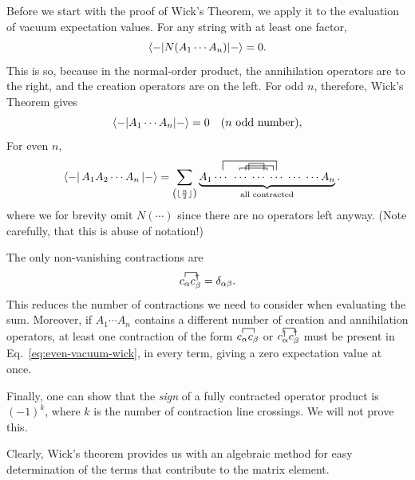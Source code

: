 \documentclass{report}
\theoremstyle{plain}
\theoremstyle{definition}
\begin{document}
Before we start with the proof of Wick's Theorem, we apply it to the
evaluation of  vacuum expectation values. For any
string with at least one factor,
\begin{equation}
  \braket{-|N(A_1\cdots A_n)|-} = 0.
\end{equation}
This is so, because in the normal-order product, the annihilation
operators are to the right, and the creation operators are on the
left. For odd $n$, therefore, Wick's Theorem gives
\begin{equation}
  \braket{-|A_1\cdots A_n|-} = 0\quad (\text{$n$ odd number}),
\end{equation}
For even $n$,
\begin{align}
\label{eq:even-vacuum-wick}
\bra{-}A_1 A_2 \cdots A_n\ket{-} &=
\sum_{\pr{\lfloor{\frac{n}{2}}\rfloor}}  \underbrace{A_1
    \contraction[2ex]{..}{A}{\hspace{4em}}{A} \cdots\;
    \contraction[.5ex]{.}{A}{......}{A}
    \contraction[1.5ex]{....}{A}{..}{A}\contraction[1ex]{...}{A}{......}{A}
    \cdots \; \cdots \; \cdots \; \cdots \;\cdots A_n}_{\text{all contracted}}.
\end{align}
where we for brevity omit $N(\cdots)$ since there are no operators
left anyway. (Note carefully, that this is abuse of notation!)

The only non-vanishing contractions are
\begin{align}
\contraction{}{\an{\alpha}}{}{\cre{\beta}}
\an{\alpha}\cre{\beta} = \delta_{\alpha \beta}.
\end{align}
This reduces the number of contractions we need to consider when
evaluating the sum. Moreover, if $A_1\cdots A_n$ contains a different number of creation and
annihilation operators, at least one contraction of the form
$\contraction{}{c_\alpha}{}{c_\beta}c_\alpha c_\beta$ or
$\contraction{}{c_\alpha}{}{c_\beta}c^\dag_\alpha
c^\dag_\beta$ must be present in Eq.~\eqref{eq:even-vacuum-wick},
in every term, giving a zero expectation value at once.


Finally, one can show that the \emph{sign} of a fully contracted
operator product is $(-1)^k$, where $k$ is the number of contraction
line crossings. We will not prove this.


Clearly, Wick's theorem provides us with an algebraic method for easy
determination of the terms that contribute to the matrix element.
\end{document}

